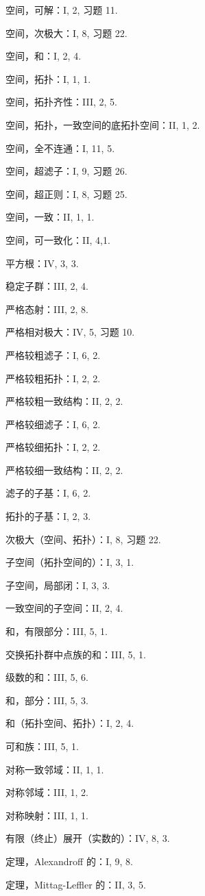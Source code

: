 空间，可解：I, 2, 习题 11.

空间，次极大：I, 8, 习题 22.

空间，和：I, 2, 4.

空间，拓扑：I, 1, 1.

空间，拓扑齐性：III, 2, 5.

空间，拓扑，一致空间的底拓扑空间：II, 1, 2.

空间，全不连通：I, 11, 5.

空间，超滤子：I, 9, 习题 26.

空间，超正则：I, 8, 习题 25.

空间，一致：II, 1, 1.

空间，可一致化：II, 4,1.

平方根：IV, 3, 3.

稳定子群：III, 2, 4.

严格态射：III, 2, 8.

严格相对极大：IV, 5, 习题 10.

严格较粗滤子：I, 6, 2.

严格较粗拓扑：I, 2, 2.

严格较粗一致结构：II, 2, 2.

严格较细滤子：I, 6, 2.

严格较细拓扑：I, 2, 2.

严格较细一致结构：II, 2, 2.

滤子的子基：I, 6, 2.

拓扑的子基：I, 2, 3.

次极大（空间、拓扑）：I, 8, 习题 22.

子空间（拓扑空间的）：I, 3, 1.

子空间，局部闭：I, 3, 3.

一致空间的子空间：II, 2, 4.

和，有限部分：III, 5, 1.

交换拓扑群中点族的和：III, 5, 1.

级数的和：III, 5, 6.

和，部分：III, 5, 3.

和（拓扑空间、拓扑）：I, 2, 4.

可和族：III, 5, 1.

对称一致邻域：II, 1, 1.

对称邻域：III, 1, 2.

对称映射：III, 1, 1.

有限（终止）展开（实数的）：IV, 8, 3.

定理，Alexandroff 的：I, 9, 8.

定理，Mittag-Leffler 的：II, 3, 5.

